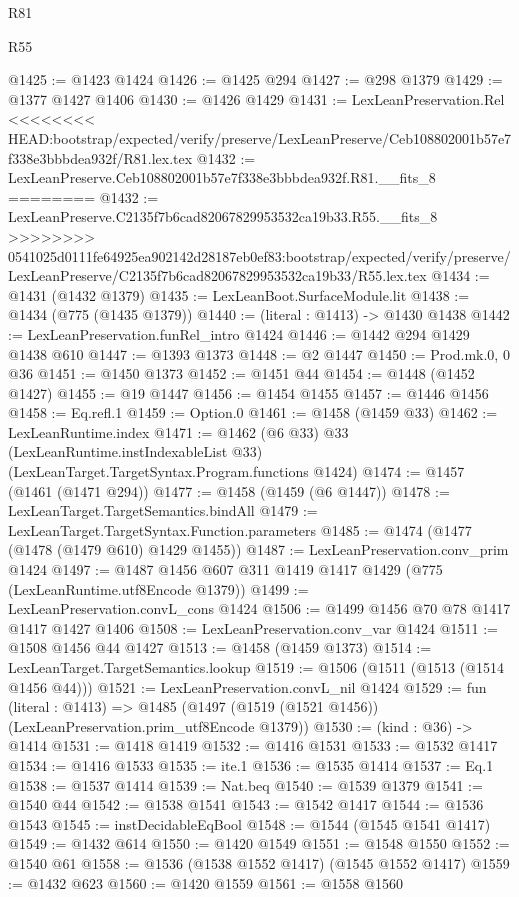 \begin{lexlean}{R81}
\begin{lexlean}{R55}
\begin{coremodule}
{{{{{{{{{{{{{{{{{{{{{{{{{{{{{{{{{{{{{{{{{{{{{{{{{{{{{{{{{{{{{{@1425 := @1423 @1424
@1426 := @1425 @294
@1427 := @298 @1379
@1429 := @1377 @1427 @1406
@1430 := @1426 @1429
@1431 := LexLeanPreservation.Rel
<<<<<<<< HEAD:bootstrap/expected/verify/preserve/LexLeanPreserve/Ceb108802001b57e7f338e3bbbdea932f/R81.lex.tex
@1432 := LexLeanPreserve.Ceb108802001b57e7f338e3bbbdea932f.R81.__fits_8
========
@1432 := LexLeanPreserve.C2135f7b6cad82067829953532ca19b33.R55.__fits_8
>>>>>>>> 0541025d0111fe64925ea902142d28187eb0ef83:bootstrap/expected/verify/preserve/LexLeanPreserve/C2135f7b6cad82067829953532ca19b33/R55.lex.tex
@1434 := @1431 (@1432 @1379)
@1435 := LexLeanBoot.SurfaceModule.lit
@1438 := @1434 (@775 (@1435 @1379))
@1440 := (literal : @1413) -> @1430 @1438
@1442 := LexLeanPreservation.funRel_intro @1424
@1446 := @1442 @294 @1429 @1438 @610
@1447 := @1393 @1373
@1448 := @2 @1447
@1450 := Prod.mk.{0, 0} @36
@1451 := @1450 @1373
@1452 := @1451 @44
@1454 := @1448 (@1452 @1427)
@1455 := @19 @1447
@1456 := @1454 @1455
@1457 := @1446 @1456
@1458 := Eq.refl.{1}
@1459 := Option.{0}
@1461 := @1458 (@1459 @33)
@1462 := LexLeanRuntime.index
@1471 := @1462
    (@6 @33)
    @33
    (LexLeanRuntime.instIndexableList @33)
    (LexLeanTarget.TargetSyntax.Program.functions @1424)
@1474 := @1457 (@1461 (@1471 @294))
@1477 := @1458 (@1459 (@6 @1447))
@1478 := LexLeanTarget.TargetSemantics.bindAll
@1479 := LexLeanTarget.TargetSyntax.Function.parameters
@1485 := @1474 (@1477 (@1478 (@1479 @610) @1429 @1455))
@1487 := LexLeanPreservation.conv_prim @1424
@1497 := @1487 @1456 @607 @311 @1419 @1417 @1429 (@775 (LexLeanRuntime.utf8Encode @1379))
@1499 := LexLeanPreservation.convL_cons @1424
@1506 := @1499 @1456 @70 @78 @1417 @1417 @1427 @1406
@1508 := LexLeanPreservation.conv_var @1424
@1511 := @1508 @1456 @44 @1427
@1513 := @1458 (@1459 @1373)
@1514 := LexLeanTarget.TargetSemantics.lookup
@1519 := @1506 (@1511 (@1513 (@1514 @1456 @44)))
@1521 := LexLeanPreservation.convL_nil @1424
@1529 := fun (literal : @1413) =>
  @1485 (@1497 (@1519 (@1521 @1456)) (LexLeanPreservation.prim_utf8Encode @1379))
@1530 := (kind : @36) -> @1414
@1531 := @1418 @1419
@1532 := @1416 @1531
@1533 := @1532 @1417
@1534 := @1416 @1533
@1535 := ite.{1}
@1536 := @1535 @1414
@1537 := Eq.{1}
@1538 := @1537 @1414
@1539 := Nat.beq
@1540 := @1539 @1379
@1541 := @1540 @44
@1542 := @1538 @1541
@1543 := @1542 @1417
@1544 := @1536 @1543
@1545 := instDecidableEqBool
@1548 := @1544 (@1545 @1541 @1417)
@1549 := @1432 @614
@1550 := @1420 @1549
@1551 := @1548 @1550
@1552 := @1540 @61
@1558 := @1536 (@1538 @1552 @1417) (@1545 @1552 @1417)
@1559 := @1432 @623
@1560 := @1420 @1559
@1561 := @1558 @1560
}}}}}}}}}}}}}}}}}}}}}}}}}}}}}}}}}}}}}}}}}}}}}}}}}}}}}}}}}}}}}}
\end{coremodule}
\end{lexlean}
\end{lexlean}
